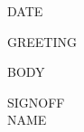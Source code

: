 \documentclass[a4paper,11pt]{article}
\begin{document}
{{DATE}}

{{GREETING}}

{{BODY}}

{{SIGNOFF}}\\
{{NAME}}
\end{document}
